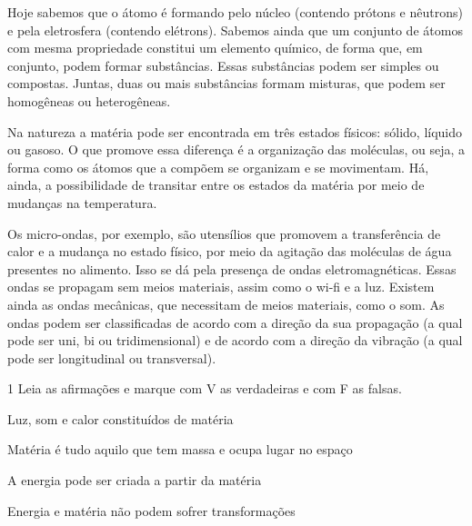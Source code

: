 {{Hoje sabemos que o átomo é formando pelo núcleo (contendo prótons e
nêutrons) e pela eletrosfera (contendo elétrons). Sabemos ainda que um
conjunto de átomos com mesma propriedade constitui um elemento químico,
de forma que, em conjunto, podem formar substâncias. Essas substâncias
podem ser simples ou compostas. Juntas, duas ou mais substâncias formam
misturas, que podem ser homogêneas ou heterogêneas.

Na natureza a matéria pode ser encontrada em três estados físicos:
sólido, líquido ou gasoso. O que promove essa diferença é a organização
das moléculas, ou seja, a forma como os átomos que a compõem se organizam
e se movimentam. Há, ainda, a possibilidade de transitar entre os estados
da matéria por meio de mudanças na temperatura.

Os micro-ondas, por exemplo, são utensílios que promovem a transferência
de calor e a mudança no estado físico, por meio da agitação das moléculas
de água presentes no alimento. Isso se dá pela presença de ondas eletromagnéticas. Essas
ondas se propagam sem meios materiais, assim como o wi-fi e a luz.
Existem ainda as ondas mecânicas, que necessitam de meios materiais,
como o som. As ondas podem ser classificadas de acordo com a direção da
sua propagação (a qual pode ser uni, bi ou tridimensional) e de acordo com a direção da
vibração (a qual pode ser longitudinal ou transversal).}


\num{1}  Leia as afirmações e marque com V as verdadeiras e com F as falsas.

\begin{boxlist}
\item Luz, som e calor constituídos de matéria 

\item Matéria é tudo aquilo que tem massa e ocupa lugar no espaço 

\item A energia pode ser criada a partir da matéria 

\item Energia e matéria não podem sofrer transformações 
\end{boxlist}


}
